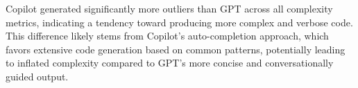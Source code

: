 Copilot generated significantly more outliers than GPT across all complexity metrics, indicating a tendency toward producing more complex and verbose code. This difference likely stems from Copilot's auto-completion approach, which favors extensive code generation based on common patterns, potentially leading to inflated complexity compared to GPT's more concise and conversationally guided output.

